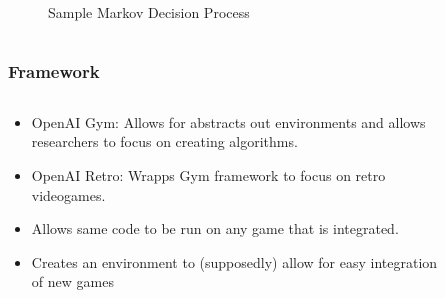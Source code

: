 \documentclass[pdf,11pt]{beamer}
\begin{document}
\begin{frame}
\begin{columns}
\begin{column}{0.49\paperwidth}
\begin{figure}
                \caption{Sample Markov Decision Process}
                \end{figure}
            \end{column}
        \end{columns}
\end{frame}

\begin{frame}
\frametitle{Framework}
        \begin{columns}
        
        \begin{column}{0.49\paperwidth}
        \begin{itemize}
        \item OpenAI Gym: Allows for abstracts out environments and allows researchers
        to focus on creating algorithms.
        \item OpenAI Retro: Wrapps Gym framework to focus on retro videogames.
        \item Allows same code to be run on any game that is integrated.
        \item Creates an environment to (supposedly) allow for easy integration of new
        games
        \end{itemize}
        \end{column}
        
        \begin{column}{0.49\paperwidth}
        \begin{figure}
        \end{figure}
        \end{column}
        \end{columns}
\end{frame}
\end{document}
